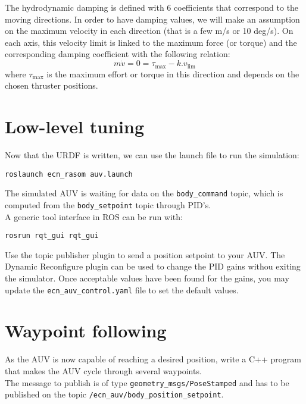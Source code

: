 \documentclass{ecnreport}
\begin{document}
The hydrodynamic damping is defined with 6 coefficients that correspond to the moving directions.
In order to have damping values, we will make an assumption on the maximum velocity in each direction (that is a few m/s or 10 deg/s).
On each axis, this velocity limit is linked to the maximum force (or torque) and the corresponding damping coefficient with the following relation:
\begin{equation*}
 m\dot v = 0 = \tau_{\max} - k.v_{\lim{}}
\end{equation*}where $\tau_{\max}$ is the maximum effort or torque in this direction and depends on the chosen thruster positions.


\section{Low-level tuning}

Now that the URDF is written, we can use the launch file to run the simulation:
\begin{center}
\begin{lstlisting}
roslaunch ecn_rasom auv.launch
\end{lstlisting}
\end{center}
The simulated AUV is waiting for data on the \texttt{body\_command} topic, which is computed from the \texttt{body\_setpoint} topic through PID's.\\
A generic tool interface in ROS can be run with:
\begin{center}
\begin{lstlisting}
rosrun rqt_gui rqt_gui
\end{lstlisting}
\end{center}
Use the topic publisher plugin to send a position setpoint to your AUV. The Dynamic Reconfigure plugin can be used to change the PID gains withou exiting the simulator.
Once acceptable values have been found for the gains, you may update the \texttt{ecn\_auv\_control.yaml} file to set the default values.

\section{Waypoint following}


As the AUV is now capable of reaching a desired position, write a C++ program that makes the AUV cycle through several waypoints. \\
The message to publish is of type \texttt{geometry\_msgs/PoseStamped} and has to be published on the topic \texttt{/ecn\_auv/body\_position\_setpoint}.
\end{document}
